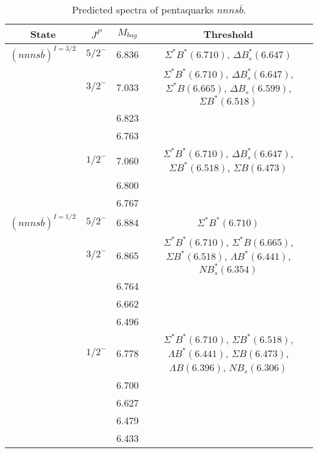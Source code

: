 \documentclass[prd,twocolumn,floatfix,nofootinbib]{revtex4}
\begin{document}
\renewcommand{\tabcolsep}{0.5cm}
\renewcommand{\arraystretch}{1.2}
\begin{table*}[!htbp]
    \caption{Predicted spectra of pentaquarks $nnns\bar{b}$.}
    \begin{tabular}{cccc}
        \hline\hline
        {\rm State} &$J^{P}$ &$M_{bag}$ &{\rm Threshold} \\ \hline
        ${(nnns\bar{b})}^{I=3/2}$
            &${5/2}^{-}$    &6.836 &$\Sigma^{\ast} B^{\ast}(6.710)$, $\Delta B^{\ast}_{s}(6.647)$ \\
            &${3/2}^{-}$    &7.033 &$\Sigma^{\ast} B^{\ast}(6.710)$, $\Delta B^{\ast}_{s}(6.647)$, $\Sigma^{\ast} B(6.665)$, $\Delta B_{s}(6.599)$, $\Sigma B^{\ast}(6.518)$ \\
            &               &6.823 & \\
            &               &6.763 & \\
            &${1/2}^{-}$    &7.060 &$\Sigma^{\ast} B^{\ast}(6.710)$, $\Delta B^{\ast}_{s}(6.647)$, $\Sigma B^{\ast}(6.518)$, $\Sigma B(6.473)$ \\
            &               &6.800 & \\
            &               &6.767 & \\
        ${(nnns\bar{b})}^{I=1/2}$
            &${5/2}^{-}$    &6.884 &$\Sigma^{\ast} B^{\ast}(6.710)$ \\
            &${3/2}^{-}$    &6.865 &$\Sigma^{\ast} B^{\ast}(6.710)$, $\Sigma^{\ast} B(6.665)$, $\Sigma B^{\ast}(6.518)$, $\Lambda B^{\ast}(6.441)$, $N B^{\ast}_{s}(6.354)$ \\
            &               &6.764 & \\
            &               &6.662 & \\
            &               &6.496 & \\
            &${1/2}^{-}$    &6.778 &$\Sigma^{\ast} B^{\ast}(6.710)$, $\Sigma B^{\ast}(6.518)$, $\Lambda B^{\ast}(6.441)$, $\Sigma B(6.473)$, $\Lambda B(6.396)$, $N B_{s}(6.306)$ \\
            &               &6.700 & \\
            &               &6.627 & \\
            &               &6.479 & \\
            &               &6.433 & \\
        \hline\hline
    \end{tabular}
\end{table*}
\end{document}
